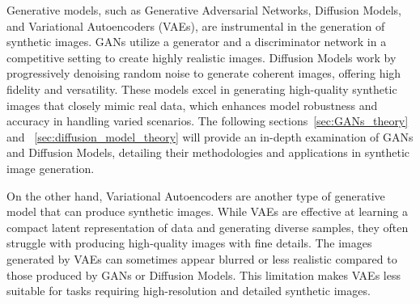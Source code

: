 \documentclass[12pt,DIV14,BCOR12mm,a4paper,footinclude=false,headinclude,parskip=half-,twoside,openright,cleardoublepage=empty,toc=index,bibliography=totoc,listof=totoc]{scrreprt}
\numberwithin{equation}{chapter}
\begin{document}
Generative models, such as Generative Adversarial Networks, Diffusion Models, and Variational Autoencoders (VAEs), are instrumental in the generation of synthetic images. GANs utilize a generator and a discriminator network in a competitive setting to create highly realistic images. Diffusion Models work by progressively denoising random noise to generate coherent images, offering high fidelity and versatility. These models excel in generating high-quality synthetic images that closely mimic real data, which enhances model robustness and accuracy in handling varied scenarios. The following sections~\ref{sec:GANs_theory} and ~\ref{sec:diffusion_model_theory} will provide an in-depth examination of GANs and Diffusion Models, detailing their methodologies and applications in synthetic image generation.

On the other hand, Variational Autoencoders are another type of generative model that can produce synthetic images. While VAEs are effective at learning a compact latent representation of data and generating diverse samples, they often struggle with producing high-quality images with fine details. The images generated by VAEs can sometimes appear blurred or less realistic compared to those produced by GANs or Diffusion Models. This limitation makes VAEs less suitable for tasks requiring high-resolution and detailed synthetic images.
\end{document}
